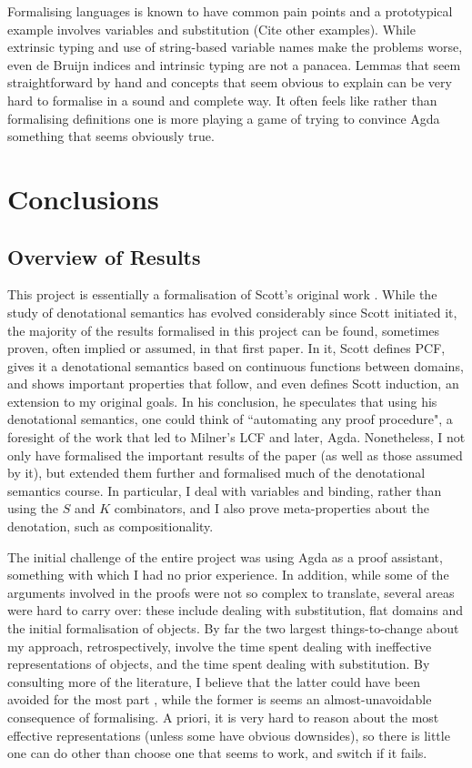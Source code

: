 \documentclass[12pt,a4paper,twoside,openright]{report}
\begin{document}
Formalising languages is known to have common pain points and a prototypical example involves variables and substitution (Cite other examples). While extrinsic typing and use of string-based variable names make the problems worse, even de Bruijn indices and intrinsic typing are not a panacea. Lemmas that seem straightforward by hand and concepts that seem obvious to explain can be very hard to formalise in a sound and complete way. It often feels like rather than formalising definitions one is more playing a game of trying to convince Agda something that seems obviously true. 
\chapter{Conclusions}
\section{Overview of Results}
This project is essentially a formalisation of Scott's original work \cite{Scott}. While the study of denotational semantics has evolved considerably since Scott initiated it, the majority of the results formalised in this project can be found, sometimes proven, often implied or assumed, in that first paper. In it, Scott defines PCF, gives it a denotational semantics based on continuous functions between domains, and shows important properties that follow, and even defines Scott induction, an extension to my original goals. In his conclusion, he speculates that using his denotational semantics, one could think of ``automating any proof procedure", a foresight of the work that led to Milner's LCF \cite{Milner-LCF} and later, Agda. Nonetheless, I not only have formalised the important results of the paper (as well as those assumed by it), but extended them further and formalised much of the denotational semantics course. In particular, I deal with variables and binding, rather than using the $S$ and $K$ combinators, and I also prove meta-properties about the denotation, such as compositionality.

The initial challenge of the entire project was using Agda as a proof assistant, something with which I had no prior experience. In addition, while some of the arguments involved in the proofs were not so complex to translate, several areas were hard to carry over: these include dealing with substitution, flat domains and the initial formalisation of objects. By far the two largest things-to-change about my approach, retrospectively, involve the time spent dealing with ineffective representations of objects, and the time spent dealing with substitution. By consulting more of the literature, I believe that the latter could have been avoided for the most part \cite{Dima-Soas} \cite{Pitts}, while the former is seems an almost-unavoidable consequence of formalising. A priori, it is very hard to reason about the most effective representations (unless some have obvious downsides), so there is little one can do other than choose one that seems to work, and switch if it fails.
\end{document}
